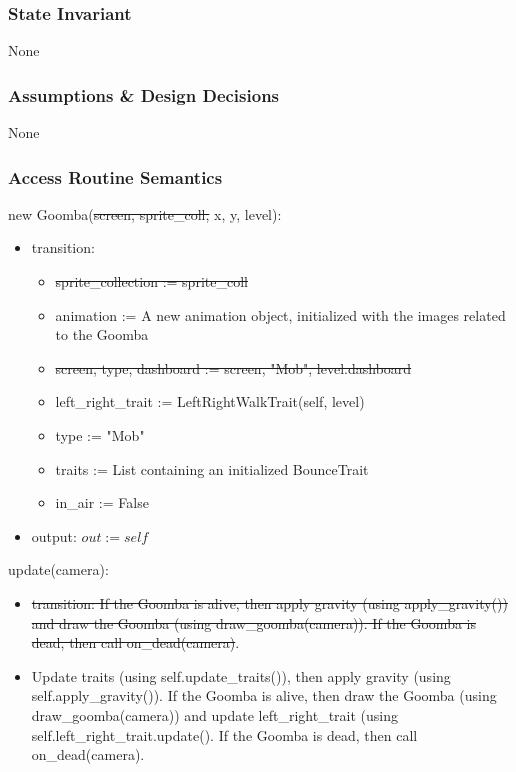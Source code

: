 \documentclass[12pt]{article}
\begin{document}
\subsubsection* {State Invariant}

None

\subsubsection* {Assumptions \& Design Decisions}

None

\subsubsection* {Access Routine Semantics}

new Goomba(\st{screen, sprite\_coll,} x, y, level):
\begin{itemize}
    \item transition: 
    \begin{itemize}[]
        \item \st{sprite\_collection := sprite\_coll}
        \item animation := A new animation object, initialized with the images related to the Goomba
        \item \st{screen, type, dashboard := screen, "Mob", level.dashboard}
        \item \color{red}left\_right\_trait := LeftRightWalkTrait(self, level)
        \item \color{red}type := "Mob"
        \item \color{red}traits := List containing an initialized BounceTrait
        \item \color{red}in\_air := False
    \end{itemize}
    \item output: $out := self$
\end{itemize}

update(camera):
\begin{itemize}
    \item \st{transition: If the Goomba is alive, then apply gravity (using apply\_gravity()) and draw the Goomba (using draw\_goomba(camera)). If the Goomba is dead, then call on\_dead(camera)}.
    \item \color{red}Update traits (using self.update\_traits()), then apply gravity (using self.apply\_gravity()). If the Goomba is alive, then draw the Goomba (using draw\_goomba(camera)) and update left\_right\_trait (using self.left\_right\_trait.update(). If the Goomba is dead, then call on\_dead(camera).
\end{itemize}
\end{document}
